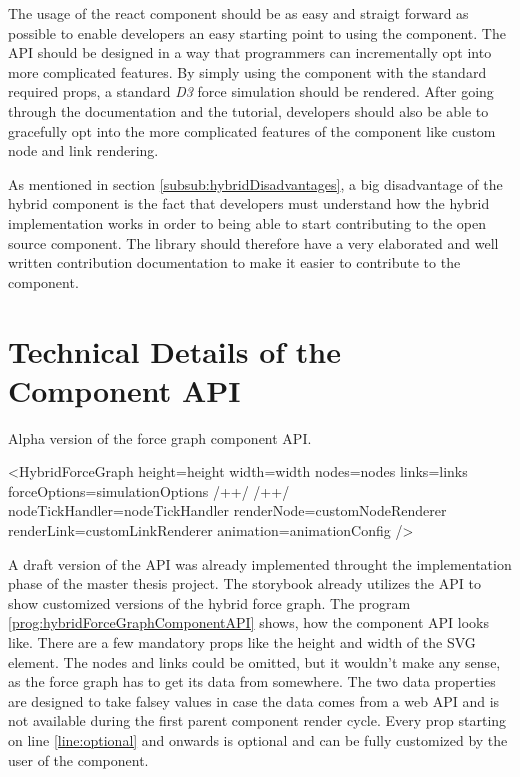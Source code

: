 The usage of the react component should be as easy and straigt forward as possible to enable developers an easy starting point to using the component. The API should be designed in a way that programmers can incrementally opt into more complicated features. By simply using the component with the standard required props, a standard \emph{D3} force simulation should be rendered. After going through the documentation and the tutorial, developers should also be able to gracefully opt into the more complicated features of the component like custom node and link rendering.

As mentioned in section \ref{subsub:hybridDisadvantages}, a big disadvantage of the hybrid component is the fact that developers must understand how the hybrid implementation works in order to being able to start contributing to the open source component. The library should therefore have a very elaborated and well written contribution documentation to make it easier to contribute to the component.

\section{Technical Details of the Component API}

\begin{program}
\caption{Alpha version of the force graph component API.}
\label{prog:hybridForceGraphComponentAPI}
\begin{JsCode}
<HybridForceGraph 
  height={height}
  width={width}
  nodes={nodes}
  links={links}
  forceOptions={simulationOptions} /+\label{line:foceOptions}+/ /+\label{line:optional}+/ 
  nodeTickHandler={nodeTickHandler}
  renderNode={customNodeRenderer}
  renderLink={customLinkRenderer}
  animation={animationConfig}
/>
\end{JsCode}
\end{program}

A draft version of the API was already implemented throught the implementation phase of the master thesis project. The storybook already utilizes the API to show customized versions of the hybrid force graph. The program \ref{prog:hybridForceGraphComponentAPI} shows, how the component API looks like. There are a few mandatory props like the height and width of the SVG element. The nodes and links could be omitted, but it wouldn't make any sense, as the force graph has to get its data from somewhere. The two data properties are designed to take falsey values in case the data comes from a web API and is not available during the first parent component render cycle. Every prop starting on line \ref{line:optional} and onwards is optional and can be fully customized by the user of the component.

